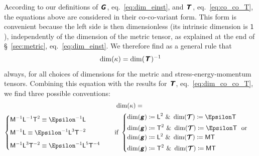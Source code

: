 \documentclass[\ifafour a4paper,12pt,\else a5paper,10pt,\fi%
onecolumn,oneside,article,%
british%
]{memoir}
\makeatletter
\theoremstyle{remark}
\theoremstyle{innote}
\newcommand*{\mathte}[1]{\textbf{\textit{\textsf{#1}}}}
\newcommand*{\amp}{\&}
\newcommand*{\defd}{\coloneqq}
\renewcommand*{\|}[1][]{\nonscript\,#1\vert\nonscript\;\mathopen{}}
\newcommand*{\sect}{\S}%
\newcommand*{\eqn}{eq.}%
\newcommand*{\q}{}%
\DeclareRobustCommand*{\q}{%
  \mathbin{\mathpalette\bigcdot@{}}%
}
\newcommand*{\bigcdot@scalefactor}{0.7}
\newcommand*{\bigcdot@widthfactor}{1.5}
\newcommand*{\bigcdot@}[2]{%
  \sbox0{$#1\vcenter{}$}%
  \sbox2{$#1\cdot\m@th$}%
  \hbox to \bigcdot@widthfactor\wd2{%
    \hfil
    \raise\ht0\hbox{%
      \scalebox{\bigcdot@scalefactor}{%
        \lower\ht0\hbox{$#1\bullet\m@th$}%
      }%
    }%
    \hfil
  }%
}
\newcommand*{\Un}{\textsf{1}}
\newcommand*{\Le}{\textsf{L}}
\newcommand*{\Ti}{\textsf{T}}
\newcommand*{\Ma}{\textsf{M}}
\newcommand*{\En}{\Epsilon}%
\newcommand*{\yg}{\mathte{g}}
\newcommand*{\yT}{\bm{\mathcal{T}}}
\newcommand*{\yTe}{\mathte{T}}
\newcommand*{\yG}{\mathte{G}}
\renewcommand*{\i}{\indices}
\newcommand*{\yk}{\kappa}
\makeatother
\begin{document}
According to our definitions of $\yG\i{_{\q\q}}$,
\eqn~\eqref{eq:dim_einst}, and $\yTe\i{_{\q\q}}$, \eqn~\eqref{eq:co_co_T},
the equations above are considered in their co-co-variant form. This form
is convenient because the left side is then dimensionless (its intrinsic
dimension is $\Un$), independently of the dimension of the metric tensor,
as explained at the end of \sect~\ref{sec:metric},
\eqn~\eqref{eq:dim_einst}. We therefore find as a general rule that
\begin{equation}
  \label{eq:dim_k_general}
  \dim(\yk) = \dim(\yTe\i{_{\q\q}})^{-1} 
\end{equation}
always, for all choices of dimensions for the metric and
stress-energy-momentum tensors. Combining this equation with the results
for $\yTe$, \eqn~\eqref{eq:dim_co_co_T}, we find three possible
conventions:
\begin{multline}
\label{eq:dim_k_choices}
\dim(\yk) ={}\\
  \begin{cases}
\Ma^{-1}\Le^{-1}\Ti^{2} \equiv \En^{-1}\Le \\[2\jot]
\Ma^{-1}\Le \equiv \En^{-1}\Le^{3}\Ti^{-2} \\[2\jot]
\Ma^{-1}\Le^{3}\Ti^{-2} \equiv \En^{-1}\Le^{5}\Ti^{-4}
  \end{cases}
  \quad\text{if }
  \begin{cases}
\dim(\yg)\defd \Le^2 \text{ \amp\ }\dim(\yT)\defd \En\Ti \\[\jot]
    \dim(\yg)\defd \Ti^2 \text{ \amp\ }\dim(\yT)\defd \En\Ti 
    \ \text{ or }\\
\dim(\yg)\defd \Le^2 \text{ \amp\ }\dim(\yT)\defd \Ma\Ti \\[\jot]
\dim(\yg)\defd \Ti^2 \text{ \amp\ }\dim(\yT)\defd \Ma\Ti
  \end{cases}
\end{multline}
\end{document}
